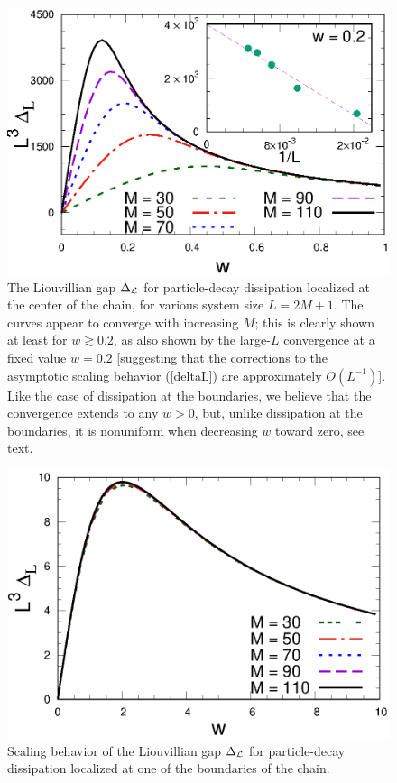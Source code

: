  \begin{figure}[!htb]
\centering
    \includegraphics[width=0.65\columnwidth]{imm/DeltawNoL3.eps}
    \caption{The Liouvillian gap $\Delta_{\cal L}$ for particle-decay
      dissipation localized at the center of the chain, for various
      system size $L=2M+1$. The curves appear to converge with
      increasing $M$; this is clearly shown at least for $w\gtrsim 0.2$,
      as also shown by the large-$L$ convergence at a fixed value
      $w=0.2$ [suggesting that the corrections to the asymptotic scaling
      behavior (\ref{deltaL}) are approximately $O(L^{-1})$].  Like the
      case of dissipation at the boundaries, we believe that the
      convergence extends to any $w>0$, but, unlike dissipation at the
      boundaries, it is nonuniform when decreasing $w$ toward zero, see
      text.} 
    \label{liogaps}
  \end{figure}
  
  
  \begin{figure}[!htb]
\centering
    \includegraphics[width=0.65\columnwidth]{imm/deltaextr.eps}
    \caption{Scaling behavior of the Liouvillian gap $\Delta_{\cal L}$
      for particle-decay dissipation localized at one of the boundaries
      of the chain.}
        \label{liogapsb}
  \end{figure}
  
  
  
